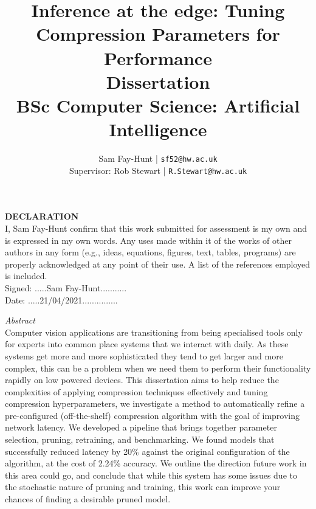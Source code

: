 \documentclass[11pt]{report}
\begin{document}
\title{%
	\bf Inference at the edge: Tuning Compression Parameters for Performance\\ 
	\large Dissertation \\
	BSc Computer Science: Artificial Intelligence}

\author{
	Sam Fay-Hunt | \texttt{sf52@hw.ac.uk}\\
	Supervisor: Rob Stewart | \texttt{R.Stewart@hw.ac.uk}
}

\maketitle
\thispagestyle{empty}
\pagebreak

\textbf{DECLARATION}\\
I, Sam Fay-Hunt confirm that this work submitted for assessment is my own and is expressed in
my own words. Any uses made within it of the works of other authors in any form (e.g., ideas,
equations, figures, text, tables, programs) are properly acknowledged at any point of their
use. A list of the references employed is included.\\
Signed: .....Sam Fay-Hunt...........\\
Date: .....21/04/2021...............
\thispagestyle{empty}
\pagebreak

\emph{Abstract} \\
Computer vision applications are transitioning from being specialised tools only for experts into common place systems that we interact with daily. 
As these systems get more and more sophisticated they tend to get larger and more complex, this can be a problem when we need them to perform their functionality rapidly on low powered devices.
This dissertation aims to help reduce the complexities of applying compression techniques effectively and tuning compression hyperparameters, we investigate a method to automatically refine a pre-configured (off-the-shelf) compression algorithm with the goal of improving network latency.
We developed a pipeline that brings together parameter selection, pruning, retraining, and benchmarking.
We found models that successfully reduced latency by 20\% against the original configuration of the algorithm, at the cost of 2.24\% accuracy.
We outline the direction future work in this area could go, and conclude that while this system has some issues due to the stochastic nature of pruning and training, this work can improve your chances of finding a desirable pruned model. 
\end{document}
